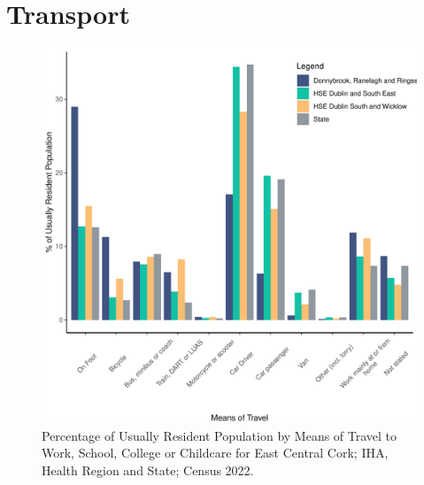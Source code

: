 \documentclass{article}
\begin{document}
\section{Transport}\label{sect:Trans}
\begin{figure}[H]
	\centering
	\includegraphics[width = 120mm]{../figures/TravelED.pdf}
	\caption{Percentage of Usually Resident Population by Means of Travel to Work, School, College or Childcare for East Central Cork; IHA, Health Region and State; Census 2022.}
	\label{fig:vbnv}
	\end{figure}
\end{document}
